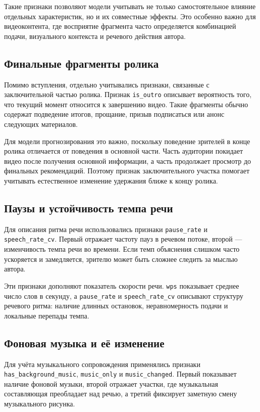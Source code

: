 \documentclass[times]{itmo-student-thesis}
\begin{document}
Такие признаки позволяют модели учитывать не только самостоятельное влияние отдельных характеристик, но и их совместные эффекты. Это особенно важно для видеоконтента, где восприятие фрагмента часто определяется комбинацией подачи, визуального контекста и речевого действия автора.

\subsection{Финальные фрагменты ролика}

Помимо вступления, отдельно учитывались признаки, связанные с заключительной частью ролика. Признак \texttt{is\_outro} описывает вероятность того, что текущий момент относится к завершению видео. Такие фрагменты обычно содержат подведение итогов, прощание, призыв подписаться или анонс следующих материалов.

Для модели прогнозирования это важно, поскольку поведение зрителей в конце ролика отличается от поведения в основной части. Часть аудитории покидает видео после получения основной информации, а часть продолжает просмотр до финальных рекомендаций. Поэтому признак заключительного участка помогает учитывать естественное изменение удержания ближе к концу ролика.

\subsection{Паузы и устойчивость темпа речи}

Для описания ритма речи использовались признаки \texttt{pause\_rate} и \texttt{speech\_rate\_cv}. Первый отражает частоту пауз в речевом потоке, второй — изменчивость темпа речи во времени. Если темп объяснения слишком часто ускоряется и замедляется, зрителю может быть сложнее следить за мыслью автора.

Эти признаки дополняют показатель скорости речи. \texttt{wps} показывает среднее число слов в секунду, а \texttt{pause\_rate} и \texttt{speech\_rate\_cv} описывают структуру речевого ритма: наличие длинных остановок, неравномерность подачи и локальные перепады темпа.

\subsection{Фоновая музыка и её изменение}

Для учёта музыкального сопровождения применялись признаки \texttt{has\_background\_music}, \texttt{music\_only} и \texttt{music\_changed}. Первый показывает наличие фоновой музыки, второй отражает участки, где музыкальная составляющая преобладает над речью, а третий фиксирует заметную смену музыкального рисунка.
\end{document}
